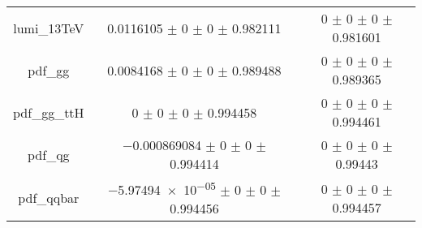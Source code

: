 \begin{table}
\begin{tabular}{ccc}
lumi\_13TeV & \num{0.0116105} $\pm$ \num{0} $\pm$ \num{0} $\pm$ \num{0.982111} & \num{0} $\pm$ \num{0} $\pm$ \num{0} $\pm$ \num{0.981601}\\
pdf\_gg & \num{0.0084168} $\pm$ \num{0} $\pm$ \num{0} $\pm$ \num{0.989488} & \num{0} $\pm$ \num{0} $\pm$ \num{0} $\pm$ \num{0.989365}\\
pdf\_gg\_ttH & \num{0} $\pm$ \num{0} $\pm$ \num{0} $\pm$ \num{0.994458} & \num{0} $\pm$ \num{0} $\pm$ \num{0} $\pm$ \num{0.994461}\\
pdf\_qg & \num{-0.000869084} $\pm$ \num{0} $\pm$ \num{0} $\pm$ \num{0.994414} & \num{0} $\pm$ \num{0} $\pm$ \num{0} $\pm$ \num{0.99443}\\
pdf\_qqbar & \num{-5.97494e-05} $\pm$ \num{0} $\pm$ \num{0} $\pm$ \num{0.994456} & \num{0} $\pm$ \num{0} $\pm$ \num{0} $\pm$ \num{0.994457}\\
\bottomrule
\end{tabular}
\end{table}